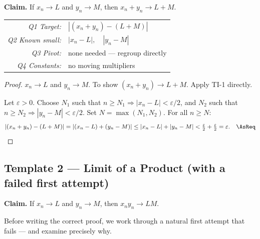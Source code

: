 \textbf{Claim.} If $x_n \to L$ and $y_n \to M$, then $x_n + y_n \to L+M$.

\begin{center}
\renewcommand{\arraystretch}{1.3}
\begin{tabular}{r l}
\toprule
\textit{Q1 Target:} & $|(x_n+y_n)-(L+M)|$ \\
\textit{Q2 Known small:} & $|x_n-L|,\quad |y_n-M|$ \\
\textit{Q3 Pivot:} & none needed — regroup directly \\
\textit{Q4 Constants:} & no moving multipliers \\
\bottomrule
\end{tabular}
\end{center}

\begin{proof}
\Given $x_n \to L$ and $y_n \to M$.
\Goal To show $(x_n+y_n) \to L+M$.
\Strategy Apply TI-1 directly.

Let $\varepsilon > 0$.
Choose $N_1$ such that $n \ge N_1 \Rightarrow |x_n-L| < \varepsilon/2$,
and $N_2$ such that $n \ge N_2 \Rightarrow |y_n-M| < \varepsilon/2$.
Set $N = \max(N_1,N_2)$.
For all $n \ge N$:
\[
  |(x_n+y_n)-(L+M)|
  = |(x_n-L)+(y_n-M)|
  \le |x_n-L|+|y_n-M|
  < \tfrac{\varepsilon}{2}+\tfrac{\varepsilon}{2} = \varepsilon. \quad\AsReq
\]
\end{proof}

\subsection{Template 2 — Limit of a Product (with a failed first attempt)}

\textbf{Claim.} If $x_n \to L$ and $y_n \to M$, then $x_n y_n \to LM$.

\medskip

\noindent Before writing the correct proof, we work through a natural
first attempt that fails --- and examine precisely why.

\medskip

